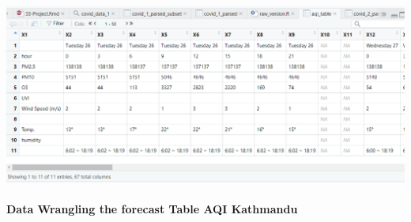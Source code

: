 \documentclass[
]{article}
\begin{document}
\includegraphics[width=1\linewidth]{aqi}

\hypertarget{data-wrangling-the-forecast-table-aqi-kathmandu}{%
\paragraph{\texorpdfstring{\textbf{Data Wrangling the forecast Table AQI
Kathmandu}}{Data Wrangling the forecast Table AQI Kathmandu}}\label{data-wrangling-the-forecast-table-aqi-kathmandu}}
\end{document}

